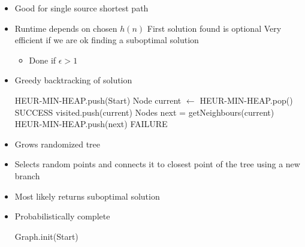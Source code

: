 \begin{itemize}
\begin{itemize}
\begin{itemize}
                    \item Good for single source shortest path
                    \item Runtime depends on chosen $h(n)$
                    \ipro First solution found is optional
                    \ipro Very efficient if we are ok finding a suboptimal solution
                        \begin{itemize}
                            \item Done if $\epsilon > 1$
                        \end{itemize}
                    \item Greedy backtracking of solution
                        \begin{algorithmic}
                            \STATE HEUR-MIN-HEAP.push(Start)
                                \STATE Node current $\leftarrow$ HEUR-MIN-HEAP.pop()
                                    \RETURN SUCCESS
                                \ENDIF
                                \STATE visited.push(current)
                                \STATE Nodes next = getNeighbours(current)
                                    \STATE HEUR-MIN-HEAP.push(next)
                                \ENDFOR
                            \ENDWHILE
                            \RETURN FAILURE
                        \end{algorithmic}
                \end{itemize}
                \begin{itemize}
                    \item Grows randomized tree
                    \item Selects random points and connects it to closest point of the tree using a new branch
                    \item Most likely returns suboptimal solution
                    \item Probabilistically complete
                        \begin{algorithmic}
                            \STATE Graph.init(Start)

\end{algorithmic}
\end{itemize}
\end{itemize}
\end{itemize}
